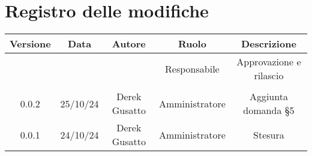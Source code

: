 
\section*{Registro delle modifiche}
\begin{table}[H]
    \begin{tabular}{|c|c|c|c|c|}
        \hline
         \textbf{Versione} &  \textbf{Data} &  \textbf{Autore} &  \textbf{Ruolo} & \textbf{Descrizione} \\
          \hline
          &  &  & Responsabile & Approvazione e rilascio\\
          \hline
          &  &  &  &  \\
          \hline
          0.0.2& 25/10/24 & Derek Gusatto & Amministratore & Aggiunta domanda §5 \\
          \hline
          0.0.1& 24/10/24 & Derek Gusatto & Amministratore & Stesura \\
          \hline
    \end{tabular}
\end{table}